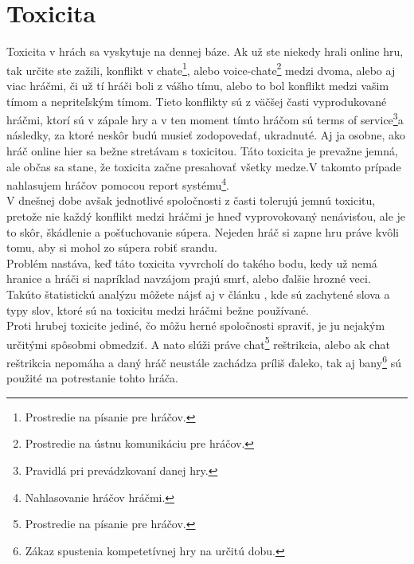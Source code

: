 \documentclass[twoside,twocolumn]{article}
\begin{document}

\section{Toxicita}

	Toxicita v hrách sa vyskytuje na dennej báze. Ak už ste niekedy hrali online hru, tak určite ste zažili, konflikt v chate\footnote{Prostredie na písanie pre hráčov.}, alebo voice-chate\footnote{Prostredie na ústnu komunikáciu pre hráčov.} medzi dvoma, alebo aj viac hráčmi, či už tí hráči boli z vášho tímu, alebo to bol konflikt medzi vašim tímom a nepriteľským tímom. Tieto konflikty sú z väčšej časti vyprodukované hráčmi, ktorí sú v zápale hry a v ten moment tímto hráčom sú terms of service\footnote{Pravidlá pri prevádzkovaní danej hry.}a následky, za ktoré neskôr budú musieť zodopovedať, ukradnuté. Aj ja osobne, ako hráč online hier sa bežne stretávam s toxicitou. Táto toxicita je prevažne jemná, ale občas sa stane, že toxicita začne presahovať všetky medze.V takomto prípade nahlasujem hráčov pomocou report systému\footnote{Nahlasovanie hráčov hráčmi.}.\\
	V dnešnej dobe avšak jednotlivé spoločnosti z časti tolerujú jemnú toxicitu, pretože nie každý konflikt medzi hráčmi je hneď vyprovokovaný nenávisťou, ale je to skôr, škádlenie a pošťuchovanie súpera. Nejeden hráč si zapne hru práve kvôli tomu, aby si mohol zo súpera robiť srandu.\\
	Problém nastáva, keď táto toxicita vyvrcholí do takého bodu, kedy už nemá hranice a hráči si napríklad navzájom prajú smrť, alebo ďalšie hrozné veci. Takúto štatistickú analýzu môžete nájsť aj v článku \cite{ghosh2021analyzing}, kde sú zachytené slova a typy slov, ktoré sú na toxicitu medzi hráčmi bežne používané.\\ 
	Proti hrubej toxicite jediné, čo môžu herné spoločnosti spraviť, je ju nejakým určitými spôsobmi obmedziť. A nato slúži práve chat\footnote{Prostredie na písanie pre hráčov.} reštrikcia, alebo ak chat reštrikcia nepomáha a daný hráč neustále zachádza príliš ďaleko, tak aj bany\footnote{Zákaz spustenia kompetetívnej hry na určitú dobu.} sú použité na potrestanie tohto hráča.\\






\end{document}
